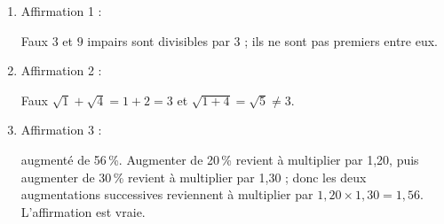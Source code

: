 
\medskip

%

\begin{enumerate}
\item Affirmation 1 :

Faux $3$ et $9$ impairs sont divisibles par 3 ; ils ne sont pas premiers entre eux.
\item Affirmation 2 :

Faux $\sqrt{1} + \sqrt{4} = 1 + 2 = 3$ et $\sqrt{1 + 4} = \sqrt{5} \ne 3$.
\item Affirmation 3 :

augmenté de 56\,\%.
Augmenter de 20\,\% revient à multiplier par 1,20, puis augmenter de 30\,\% revient à multiplier par 1,30 ; donc les deux augmentations successives reviennent à multiplier par $1,20 \times 1,30 = 1,56$. L'affirmation est vraie.
\end{enumerate}

\bigskip

